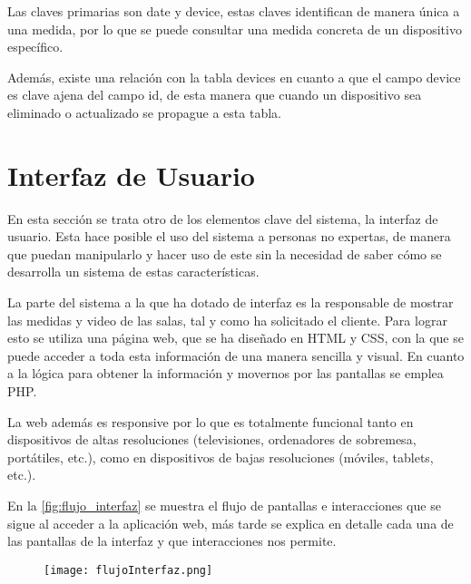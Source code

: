 Las claves primarias son date y device, estas claves identifican de manera única a una medida, por lo que se puede consultar una medida concreta de un dispositivo específico.

Además, existe una relación con la tabla devices en cuanto a que el campo device es clave ajena del campo id, de esta manera que cuando un dispositivo sea eliminado o actualizado se propague a esta tabla.

\section{Interfaz de Usuario}\label{sec:interfaz}
En esta sección se trata otro de los elementos clave del sistema, la interfaz de usuario. Esta hace posible el uso del sistema a personas no expertas, de manera que puedan manipularlo y hacer uso de este sin la necesidad de saber cómo se desarrolla un sistema de estas características.

La parte del sistema a la que ha dotado de interfaz es la responsable de mostrar las medidas y video de las salas, tal y como ha solicitado el cliente. Para lograr esto se utiliza una página web, que se ha diseñado en HTML y CSS, con la que se puede acceder a toda esta información de una manera sencilla y visual. En cuanto a la lógica para obtener la información y movernos por las pantallas se emplea PHP.

La web además es responsive por lo que es totalmente funcional tanto en dispositivos de altas resoluciones (televisiones, ordenadores de sobremesa, portátiles, etc.), como en dispositivos de bajas resoluciones (móviles, tablets, etc.).

En la \autoref{fig:flujo_interfaz} se muestra el flujo de pantallas e interacciones que se sigue al acceder a la aplicación web, más tarde se explica en detalle cada una de las pantallas de la interfaz y que interacciones nos permite.
\begin{figure}[H]
	{\texttt{[image: flujoInterfaz.png]}}
\end{figure}

